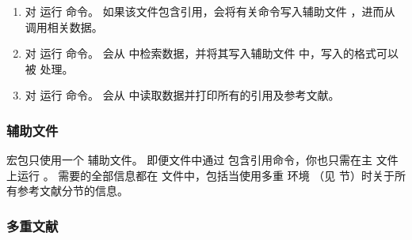 \begin{enumerate}

\item %
对  运行  命令。
如果该文件包含引用，\biblatex 会将有关命令写入辅助文件 ，进而从 \biber 调用相关数据。
\item %
对  运行  命令。
\biber 会从  中检索数据，并将其写入辅助文件  中，写入的格式可以被 \biblatex 处理。
\item %
对  运行  命令。
\biblatex 会从  中读取数据并打印所有的引用及参考文献。

\end{enumerate}

\subsubsection{辅助文件}%
\label{use:use:aux}


\biblatex 宏包只使用一个  辅助文件。
即便文件中通过  包含引用命令，你也只需在主  文件上运行 \biber 。
\biber 需要的全部信息都在  文件中，包括当使用多重  环境
（见  节）时关于所有参考文献分节的信息。

\subsubsection{多重文献}%
\label{use:use:mlt}

